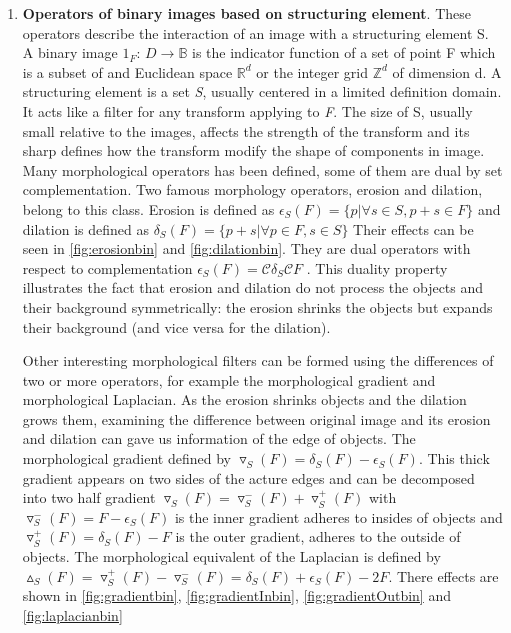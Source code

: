 \begin{enumerate}
\item \textbf{Operators of binary images based on structuring element}. These operators describe the interaction of an image with a structuring element S. A binary image $1_F$: $ D \rightarrow \mathbb{B} $ is the indicator function of a set of point F which is a subset of and Euclidean space $ \mathbb{R}^d $ or the integer grid $\mathbb{Z}^d$ of dimension d. A structuring element is a set \textit{S}, usually centered in a limited definition domain. It acts like a filter for any transform applying to \textit{F}. The size of S, usually small relative to the images, affects the strength of the transform and its sharp defines how the transform modify the shape of components in image. Many morphological operators has been defined, some of them are dual by set complementation. Two famous morphology operators, erosion and dilation, belong to this class. Erosion is defined as $ \epsilon_S (F) = \lbrace p  \vert  \forall s \in S, p + s \in F\rbrace $  and dilation is defined as $ \delta_S (F) = \lbrace p+s  \vert  \forall p \in F, s \in S\rbrace $ Their effects can be seen in \ref{fig:erosionbin} and \ref{fig:dilationbin}. They are dual operators with respect to complementation $ \epsilon_S (F) = \mathcal{C} {\delta_{S}\mathcal{C}F} $ . This duality property illustrates the fact that erosion and dilation do not process the objects and their background symmetrically: the erosion shrinks the objects but expands their background (and vice versa for the dilation).
\par Other interesting morphological filters can be formed using the differences of two or more operators, for example the morphological gradient and morphological Laplacian. As the erosion shrinks objects and the dilation grows them, examining the difference between original image and its erosion and dilation can gave us information of the edge of objects. The morphological gradient defined by $\triangledown_S (F) = \delta_S (F) - \epsilon_S (F) $. This thick gradient appears on two sides of the acture edges and can be decomposed into two half gradient $\triangledown_S (F) = \triangledown_S ^- (F) + \triangledown_S ^+ (F)$ with $ \triangledown_S ^- (F) = F - \epsilon_S (F)$ is the inner gradient adheres to insides of objects and $ \triangledown_S ^+ (F) =\delta_S (F) - F$ is the outer gradient, adheres to the outside of objects. The morphological equivalent of the Laplacian is defined by $\vartriangle_S (F) =\triangledown_S ^+ (F) - \triangledown_S ^- (F)=\delta_S (F)+\epsilon_S (F) - 2F$. There effects are shown in \ref{fig:gradientbin}, \ref{fig:gradientInbin}, \ref{fig:gradientOutbin} and \ref{fig:laplacianbin}


\end{enumerate}
